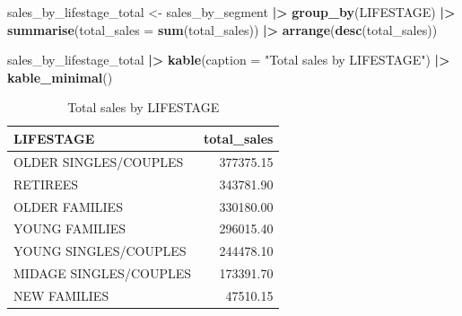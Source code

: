 \documentclass[
]{article}
\newenvironment{Shaded}{\begin{snugshade}}{\end{snugshade}}
\newcommand{\AttributeTok}[1]{\textcolor[rgb]{0.13,0.29,0.53}{#1}}
\newcommand{\FunctionTok}[1]{\textcolor[rgb]{0.13,0.29,0.53}{\textbf{#1}}}
\newcommand{\NormalTok}[1]{#1}
\newcommand{\OtherTok}[1]{\textcolor[rgb]{0.56,0.35,0.01}{#1}}
\newcommand{\SpecialCharTok}[1]{\textcolor[rgb]{0.81,0.36,0.00}{\textbf{#1}}}
\newcommand{\StringTok}[1]{\textcolor[rgb]{0.31,0.60,0.02}{#1}}
\begin{document}
\begin{Shaded}
\begin{Highlighting}[]
\NormalTok{sales\_by\_lifestage\_total }\OtherTok{\textless{}{-}}\NormalTok{ sales\_by\_segment }\SpecialCharTok{|\textgreater{}} 
  \FunctionTok{group\_by}\NormalTok{(LIFESTAGE) }\SpecialCharTok{|\textgreater{}} 
  \FunctionTok{summarise}\NormalTok{(}\AttributeTok{total\_sales =} \FunctionTok{sum}\NormalTok{(total\_sales)) }\SpecialCharTok{|\textgreater{}} 
  \FunctionTok{arrange}\NormalTok{(}\FunctionTok{desc}\NormalTok{(total\_sales))}

\NormalTok{sales\_by\_lifestage\_total }\SpecialCharTok{|\textgreater{}} 
  \FunctionTok{kable}\NormalTok{(}\AttributeTok{caption =} \StringTok{"Total sales by LIFESTAGE"}\NormalTok{) }\SpecialCharTok{|\textgreater{}} 
  \FunctionTok{kable\_minimal}\NormalTok{()}
\end{Highlighting}
\end{Shaded}

\begin{longtable}[t]{lr}
\caption{\label{tab:sales-by-segment-table}Total sales by LIFESTAGE}\\
\toprule
LIFESTAGE & total\_sales\\
\midrule
OLDER SINGLES/COUPLES & 377375.15\\
RETIREES & 343781.90\\
OLDER FAMILIES & 330180.00\\
YOUNG FAMILIES & 296015.40\\
YOUNG SINGLES/COUPLES & 244478.10\\
\addlinespace
MIDAGE SINGLES/COUPLES & 173391.70\\
NEW FAMILIES & 47510.15\\
\bottomrule
\end{longtable}
\end{document}
